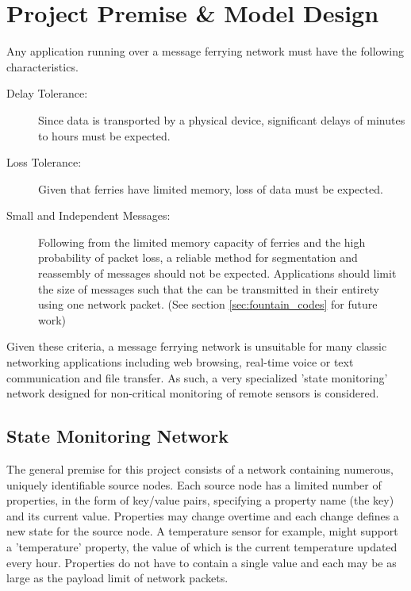 \chapter{Project Premise \& Model Design} 


Any application running over a message ferrying network must have the following characteristics.

\begin{description}
\item[Delay Tolerance: ]
Since data is transported by a physical device, significant delays of minutes to hours must be expected.
\item[Loss Tolerance: ]
Given that ferries have limited memory, loss of data must be expected.
\item[Small and Independent Messages: ]
Following from the limited memory capacity of ferries and the high probability of packet loss, a reliable method for segmentation and reassembly of messages should not be expected. 
Applications should limit the size of messages such that the can be transmitted in their entirety using one network packet.
(See section \ref{sec:fountain_codes} for future work)
\end{description}

Given these criteria, a message ferrying network is unsuitable for many classic networking applications including web browsing, real-time voice or text communication and file transfer.
As such, a very specialized 'state monitoring' network designed for non-critical monitoring of remote sensors is considered.

\section{State Monitoring Network}

The general premise for this project consists of a network containing numerous, uniquely identifiable source nodes. 
Each source node has a limited number of properties, in the form of key/value pairs, specifying a property name (the key) and its current value.
Properties may change overtime and each change defines a new state for the source node.
A temperature sensor for example, might support a 'temperature' property, the value of which is the current temperature updated every hour.
Properties do not have to contain a single value and each may be as large as the payload limit of network packets. %


